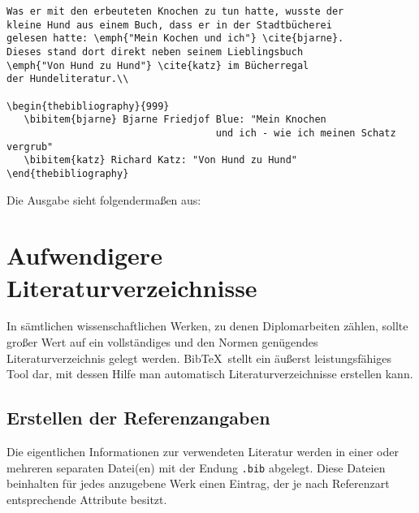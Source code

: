 \begin{verbatim}
Was er mit den erbeuteten Knochen zu tun hatte, wusste der
kleine Hund aus einem Buch, dass er in der Stadtbücherei
gelesen hatte: \emph{"Mein Kochen und ich"} \cite{bjarne}.
Dieses stand dort direkt neben seinem Lieblingsbuch
\emph{"Von Hund zu Hund"} \cite{katz} im Bücherregal
der Hundeliteratur.\\

\begin{thebibliography}{999}
   \bibitem{bjarne} Bjarne Friedjof Blue: "Mein Knochen
   									und ich - wie ich meinen Schatz vergrub"
   \bibitem{katz} Richard Katz: "Von Hund zu Hund"
\end{thebibliography}

\end{verbatim}

Die Ausgabe sieht folgendermaßen aus:


\section{Aufwendigere Literaturverzeichnisse}
In sämtlichen wissenschaftlichen Werken, zu denen Diplomarbeiten zählen, sollte großer Wert auf ein vollständiges und den Normen genügendes Literaturverzeichnis gelegt werden. Bib\TeX \ stellt ein äußerst leistungsfähiges Tool dar, mit dessen Hilfe man automatisch Literaturverzeichnisse erstellen kann.

\subsection{Erstellen der Referenzangaben}
Die eigentlichen Informationen zur verwendeten Literatur werden in einer oder mehreren
separaten Datei(en) mit der Endung \texttt{.bib} abgelegt. Diese Dateien beinhalten für
jedes anzugebene Werk einen Eintrag, der je nach Referenzart entsprechende Attribute
besitzt.

